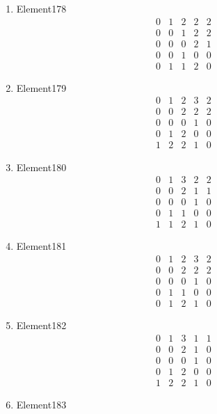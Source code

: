\documentclass[12pt]{article}
\begin{document}
\begin{multicols}{3}
\begin{enumerate}
\item Element178
\begin{equation*}
\begin{array}{ccccc}
0&1&2&2&2\\
0&0&1&2&2\\
0&0&0&2&1\\
0&0&1&0&0\\
0&1&1&2&0
\end{array}
\end{equation*}
\item Element179
\begin{equation*}
\begin{array}{ccccc}
0&1&2&3&2\\
0&0&2&2&2\\
0&0&0&1&0\\
0&1&2&0&0\\
1&2&2&1&0
\end{array}
\end{equation*}
\item Element180
\begin{equation*}
\begin{array}{ccccc}
0&1&3&2&2\\
0&0&2&1&1\\
0&0&0&1&0\\
0&1&1&0&0\\
1&1&2&1&0
\end{array}
\end{equation*}
\item Element181
\begin{equation*}
\begin{array}{ccccc}
0&1&2&3&2\\
0&0&2&2&2\\
0&0&0&1&0\\
0&1&1&0&0\\
0&1&2&1&0
\end{array}
\end{equation*}
\item Element182
\begin{equation*}
\begin{array}{ccccc}
0&1&3&1&1\\
0&0&2&1&0\\
0&0&0&1&0\\
0&1&2&0&0\\
1&2&2&1&0
\end{array}
\end{equation*}
\item Element183
\begin{equation*}

\end{equation*}
\end{enumerate}
\end{multicols}
\end{document}
